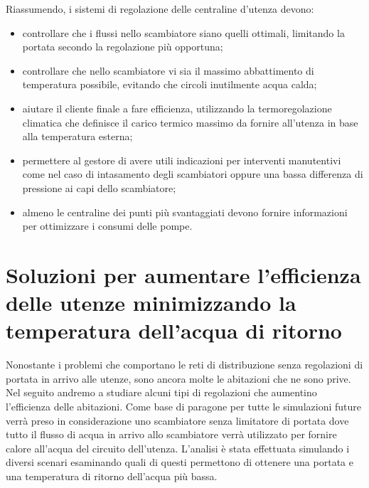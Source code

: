\documentclass[laurea,oneside,11pt]{USiena_tesiLM3}
\begin{document}
Riassumendo, i sistemi di regolazione delle centraline d'utenza devono:
\begin{itemize}
\item controllare che i flussi nello scambiatore siano quelli ottimali, limitando la portata secondo la regolazione più opportuna;
\item controllare che nello scambiatore vi sia il massimo abbattimento di temperatura possibile, evitando che circoli inutilmente acqua calda;
\item aiutare il cliente finale a fare efficienza, utilizzando la termoregolazione climatica che definisce il carico termico massimo da fornire all'utenza in base alla temperatura esterna;
\item permettere al gestore di avere utili indicazioni per interventi manutentivi come nel caso di intasamento degli scambiatori oppure una bassa differenza di pressione ai capi dello scambiatore;
\item almeno le centraline dei punti più svantaggiati devono fornire informazioni per ottimizzare i consumi delle pompe.
\end{itemize}

\section{Soluzioni per aumentare l'efficienza delle utenze minimizzando la temperatura dell'acqua di ritorno}
Nonostante i problemi che comportano le reti di distribuzione senza regolazioni di portata in arrivo alle utenze, sono ancora molte le abitazioni che ne sono prive.
Nel seguito andremo a studiare alcuni tipi di regolazioni che aumentino l'efficienza delle abitazioni. 
Come base di paragone per tutte le simulazioni future verrà preso in considerazione uno scambiatore senza limitatore di portata dove tutto il flusso di acqua in arrivo allo scambiatore verrà utilizzato per fornire calore all'acqua del circuito dell'utenza. 
L'analisi è stata effettuata  simulando i diversi scenari esaminando quali di questi permettono di ottenere una portata e una temperatura di ritorno dell'acqua più bassa.
\end{document}
